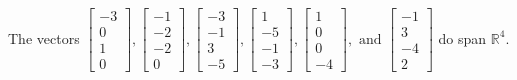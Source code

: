\begin{exercise}
\begin{exerciseStatement}
  \end{exerciseStatement}
  \begin{exerciseAnswer}
   The vectors \(\left[\begin{array}{r}
-3 \\
0 \\
1 \\
0
\end{array}\right] , \left[\begin{array}{r}
-1 \\
-2 \\
-2 \\
0
\end{array}\right] , \left[\begin{array}{r}
-3 \\
-1 \\
3 \\
-5
\end{array}\right] , \left[\begin{array}{r}
1 \\
-5 \\
-1 \\
-3
\end{array}\right] , \left[\begin{array}{r}
1 \\
0 \\
0 \\
-4
\end{array}\right] , \text{ and } \left[\begin{array}{r}
-1 \\
3 \\
-4 \\
2
\end{array}\right]\) 
  	 do  
	span \(\mathbb{R}^4\).
  


  \end{exerciseAnswer}
\end{exercise}